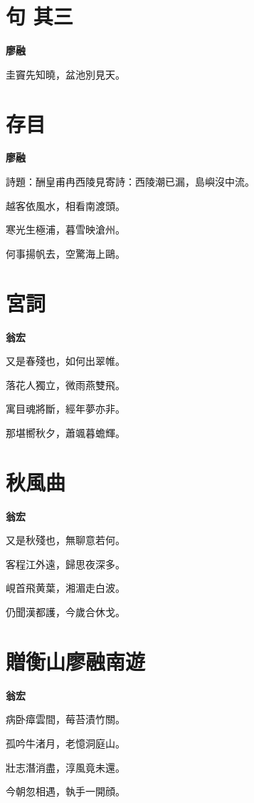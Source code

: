 \documentclass[12pt,a4paper]{ctexbook}
\begin{document}
\section{句  其三}
\textbf{廖融}\par\vspace{0.5em}
圭竇先知曉，盆池別見天。\par

\section{存目}
\textbf{廖融}\par\vspace{0.5em}
詩題：酬皇甫冉西陵見寄詩：西陵潮已漏，島嶼沒中流。\par
越客依風水，相看南渡頭。\par
寒光生極浦，暮雪映滄州。\par
何事揚帆去，空驚海上鷗。\par

\section{宮詞}
\textbf{翁宏}\par\vspace{0.5em}
又是春殘也，如何出翠帷。\par
落花人獨立，微雨燕雙飛。\par
寓目魂將斷，經年夢亦非。\par
那堪嚮秋夕，蕭颯暮蟾輝。\par

\section{秋風曲}
\textbf{翁宏}\par\vspace{0.5em}
又是秋殘也，無聊意若何。\par
客程江外遠，歸思夜深多。\par
峴首飛黄葉，湘湄走白波。\par
仍聞漢都護，今歲合休戈。\par

\section{贈衡山廖融南遊}
\textbf{翁宏}\par\vspace{0.5em}
病卧瘴雲間，莓苔漬竹關。\par
孤吟牛渚月，老憶洞庭山。\par
壯志潛消盡，淳風竟未還。\par
今朝忽相遇，執手一開顔。\par
\end{document}

